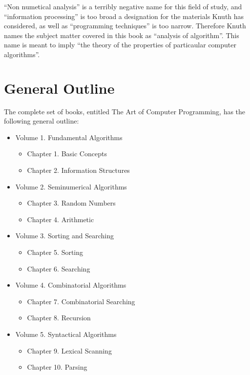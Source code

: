 \documentclass{article}
\begin{document}
``Non numetical analysis'' is a terribly negative name for this field of study, and ``information processing'' is too broad a designation for the materials Knuth has considered, as well as ``programming techniques'' is too narrow. Therefore Knuth names the subject matter covered in this book as ``analysis of algorithm''.  This name is meant to imply ``the theory of the properties of particaular computer algorithms''.
\newpage

\section{General Outline}
The complete set of books, entitled The Art of Computer Programming, has the following general outline:
\begin{itemize}
    \item[] Volume 1. Fundamental Algorithms 
        \begin{itemize}
            \item[] Chapter 1. Basic Concepts
            \item[] Chapter 2. Information Structures
        \end{itemize}
    \item[] Volume 2. Seminumerical Algorithms 
        \begin{itemize}
            \item[] Chapter 3. Random Numbers
            \item[] Chapter 4. Arithmetic
        \end{itemize}    
    \item[] Volume 3. Sorting and Searching
        \begin{itemize}
            \item[] Chapter 5. Sorting
            \item[] Chapter 6. Searching
        \end{itemize}    
    \item[] Volume 4. Combinatorial Algorithms 
        \begin{itemize}
            \item[] Chapter 7. Combinatorial Searching
            \item[] Chapter 8. Recursion
        \end{itemize}
    \item[] Volume 5. Syntactical Algorithms
        \begin{itemize}
            \item[] Chapter 9. Lexical Scanning
            \item[] Chapter 10. Parsing
        \end{itemize}
\end{itemize}
\end{document}
